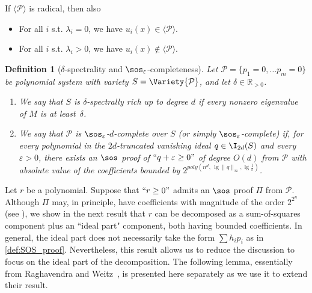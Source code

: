 \documentclass[11pt]{article}
\newtheorem{definition}[theorem]{Definition}
\begin{document}
{\begin{corol}
    If $\langle \mathcal{P} \rangle$ is radical, then also
    \begin{itemize}
        \item For all $i$ s.t. $\lambda_i = 0$, we have $u_i(x) \in \langle \mathcal{P} \rangle$.
        \item For all $i$ s.t. $\lambda_i > 0$, we have $u_i(x) \notin \langle \mathcal{P} \rangle$.
    \end{itemize}
\end{corol}
}

\begin{definition}[$\delta$-spectrality and $\sos_\varepsilon$-completeness]\label{def:delta+soscomplete}
    Let $\mathcal{P}=\{p_1=0, \dots p_m=0\}$ be polynomial system with variety $S = \Variety{\mathcal{P}}$, and let $\delta \in \mathbb{R}_{>0}$. 
    \begin{enumerate}
        \item We say that \emph{$S$ is $\delta$-spectrally rich up to degree $d$} if every nonzero eigenvalue of $M$ is at least~$\delta$.
        \item We say that \emph{$\mathcal{P}$ is $\sos_\varepsilon$-$d$-complete over $S$} (or simply $\sos_\varepsilon$-complete) if, for every polynomial in the $2d$-truncated vanishing ideal $q \in \I_{2d}(S)$ and every $\varepsilon > 0$, there exists an $\sos$ proof of $``q + \varepsilon \geq 0"$ of degree $O(d)$ from $\mathcal{P}$ with absolute value of the coefficients bounded by $2^{poly(n^d, \, \lg \| q \|_{\infty}, \lg \frac{1}{\varepsilon})}$.
    \end{enumerate}
\end{definition}

Let $r$ be a polynomial. Suppose that $``r \geq 0"$ admits an $\sos$ proof $\Pi$ from $\mathcal{P}$. Although $\Pi$ may, in principle, have coefficients with magnitude of the order $2^{2^n}$ (see \cite{odonnell2017,raghavendra_weitz2017}), we show in the next result that $r$ can be decomposed as a sum-of-squares component plus an ``ideal part" component, both having bounded coefficients. In general, the ideal part does not necessarily take the form $\sum h_i p_i$ as in \cref{def:SOS_proof}. Nevertheless, this result allows us to reduce the discussion to focus on the ideal part of the decomposition. The following lemma, essentially from Raghavendra and Weitz~\cite{raghavendra_weitz2017}, is presented here separately as we use it to extend their result.
\end{document}
